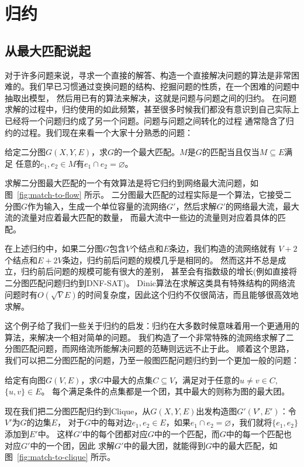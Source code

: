 \chapter{归约}


\section{从最大匹配说起}

对于许多问题来说，寻求一个直接的解答、构造一个直接解决问题的算法是非常困难的。我们早已习惯通过变换问题的结构、挖掘问题的性质，在一个困难的问题中抽取出模型，
然后用已有的算法来解决，这就是问题与问题之间的归约。
在问题求解的过程中，归约使用的如此频繁，甚至很多时候我们都没有意识到自己实际上已经将一个问题归约成了另一个问题。问题与问题之间转化的过程
通常隐含了归约的过程。我们现在来看一个大家十分熟悉的问题：

\begin{prob}
 给定二分图$G(X,Y,E)$，求$G$的一个最大匹配。$M$是$G$的匹配当且仅当$M\subseteq E$满足
 任意的$e_1, e_2 \in M$有$e_1\cap e_2 = \varnothing$。
\end{prob}
\begin{solution}
求解二分图最大匹配的一个有效算法是将它归约到网络最大流问题，如图~\ref{fig:match-to-flow} 所示。
二分图最大匹配的过程实际是一个算法，它接受二分图$G$作为输入，生成一个单位容量的流网络$G'$，然后求解$G'$的网络最大流，最大流的流量对应着最大匹配的数量，
而最大流中一些边的流量则对应着具体的匹配。



在上述归约中，如果二分图$G$包含$V$个结点和$E$条边，我们构造的流网络就有
$V+2$个结点和$E+2V$条边，归约前后问题的规模几乎是相同的。
然而这并不总是成立，归约前后问题的规模可能有很大的差别，
甚至会有指数级的增长(例如直接将二分图匹配问题归约到DNF-SAT)。 %
Dinic算法在求解这类具有特殊结构的网络流问题时有$O(\sqrt{V} E)$的时间复杂度，因此这个归约不仅很简洁，而且能够很高效地求解。
\end{solution}

这个例子给了我们一些关于归约的启发：归约在大多数时候意味着用一个更通用的算法，来解决一个相对简单的问题。
我们构造了一个非常特殊的流网络求解了二分图匹配问题，而网络流所能解决问题的范畴则远远不止于此。
顺着这个思路，我们可以把二分图匹配的问题，乃至一般图匹配问题归约到一个更加一般的问题：

\begin{prob}
给定有向图$G(V,E)$，求$G$中最大的点集$C\subseteq V$，满足对于任意的$u\neq v \in C$, $\{u, v\} \in E$。
每个满足条件的点集都是一个团，其中最大的则称为图的最大团。
\end{prob}
\begin{solution}
现在我们把二分图匹配归约到Clique，从$G(X, Y, E)$出发构造图$G'(V',E')$：令$V'$为$G$的边集$E$，
对于$G$中的每对边$e_1, e_2 \in E$，如果$e_1 \cap e_2 = \varnothing$，我们就将$\{e_1, e_2\}$添加到$E'$中。
这样$G'$中的每个团都对应$G$中的一个匹配，而$G$中的每一个匹配也对应$G'$中的一个团，因此
求解$G'$中的最大团，就能得到$G$中的最大匹配，如图~\ref{fig:match-to-clique} 所示。
\end{solution}

